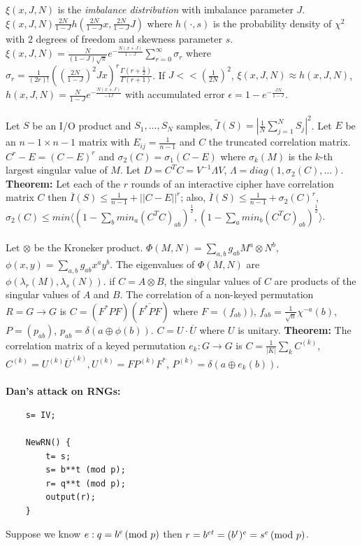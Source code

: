$\xi(x,J,N)$ is the \emph{imbalance distribution} with imbalance parameter $J$.
$\xi(x,J,N) {\frac {2N} {1-J}} h({\frac {2N} {1-J}}x, {\frac {2N} {1-J}}J) $  where
$h(\cdot, s)$ is the probability density of $\chi^2$ with $2$ degrees of freedom
and skewness parameter $s$.  
$\xi(x,J,N)= {\frac N {(1-J) {\sqrt \pi}}} e^{-{\frac {N(x+J)} {1-J}}}
\sum_{r=0}^{\infty} \sigma_r$ where $\sigma_r= {\frac 1 {(2r)!}} (({\frac {2N} {1-J}})^2 Jx)^r
{\frac {\Gamma(r+{\frac 1 2})} {\Gamma(r+1)}}$.  If $J << ({\frac 1 {2N}})^2$, $\xi(x,J,N) \approx
h(x,J,N)$, $h(x,J,N)= {\frac N {1-J}} e^{-{\frac {N(x+J)} {-1J}}}$ with accumulated
error $\epsilon= 1- e^{-{\frac {JN} {1-J}}}$.
\\
\\
Let $S$ be an I/O product and $S_1, \ldots , S_N$ samples,
${\tilde I}(S) = |{\frac 1 N} \sum_{j=1}^N S_j |^2$.  Let $E$ be an ${n-1 \times n-1}$
matrix with $E_{ij}= {\frac 1 {n-1}}$ and $C$ the truncated correlation matrix.
$C^r-E= (C-E)^r$ and $\sigma_2(C)= \sigma_1(C-E)$ where $\sigma_k(M)$ is the $k$-th largest
singular value of $M$.  Let $D= C^T C= V^{-1} \Lambda V$, $\Lambda= diag(1, \sigma_2(C) , \ldots)$.
{\bf Theorem:} Let each of the $r$ rounds of an interactive cipher have correlation matrix
$C$ then ${\overline I}(S) \le {\frac 1 {n-1}} + ||C-E||^r$; also,
${\overline I}(S) \le {\frac 1 {n-1}} + \sigma_2(C)^r$,
$\sigma_2(C) \le min \langle 
(1-\sum_b min_a (C^TC)_{ab})^{\frac 1 2}, (1-\sum_a min_b (C^TC)_{ab})^{\frac 1 2} \rangle$.
\\
\\
Let $\otimes$ be the Kroneker product.  
$\Phi(M,N)= \sum_{a,b} g_{ab} M^a \otimes N^b$,
$\phi(x,y)= \sum_{a,b} g_{ab} x^a y^b$.  The eigenvalues of $\Phi(M,N)$ are
$\phi(\lambda_r(M), \lambda_s(N))$.  if $C= A \otimes B$, the singular values of
$C$ are products of the singular values of $A$ and $B$.
The correlation of a non-keyed permutation $R= G \rightarrow G$ is $C= (F^*PF) ({\overline
{F^*PF}})$ where $F=(f_{ab}))$, $f_{ab}= {\frac 1 {\sqrt n}} \chi^{-a}(b)$, $P= (p_{ab})$,
$p_{ab} = \delta (a \oplus \phi(b))$.  $C=U \cdot {\overline U}$ where $U$ is unitary.
{\bf Theorem:} The correlation matrix of a keyed permutation $e_k: G \rightarrow G$ is
$C= {\frac 1 {|K|}} \sum_k C^{(k)}$, $C^{(k)}= U^{(k)} {\overline U}^{(k)}, U^(k)= F P^{(k)} F^*$,
$P^{(k)}= \delta(a \oplus e_k(b))$.
\\
\\
{\bf Dan's attack on RNGs:}
\begin{verbatim}
    s= IV;

    NewRN() {
        t= s;
        s= b**t (mod p);
        r= q**t (mod p);
        output(r);
    }
\end{verbatim}
Suppose we know $e: q=b^e \thinspace \textnormal{(mod } p \textnormal{)}$ then $r= b^{et}= (b^t)^e = s^e \thinspace \textnormal{(mod } p \textnormal{)}$.
